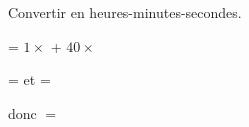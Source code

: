 \begin{exercice}
    Convertir  en heures-minutes-secondes.
\end{exercice}
\begin{corrige}
     = $1\times $  + $40\times $ 
    
     =  et  = 
    
    donc  $=$  
\end{corrige}